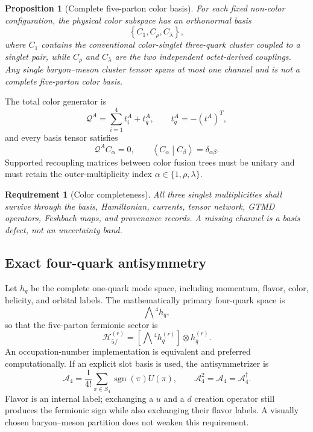 \documentclass[11pt]{article}
\newtheorem{requirement}[definition]{Requirement}
\newtheorem{proposition}[definition]{Proposition}
\newcommand{\Hil}{\mathcal H}
\newcommand{\cQ}{\mathcal Q}
\newcommand{\cA}{\mathcal A}
\newcommand{\inner}[2]{\left\langle #1\middle|#2\right\rangle}
\begin{document}
\begin{proposition}[Complete five-parton color basis]
For each fixed non-color configuration, the physical color subspace has an
orthonormal basis
\begin{equation}
 \left\{
 C_{1},C_{\rho},C_{\lambda}
 \right\},
\end{equation}
where \(C_1\) contains the conventional color-singlet three-quark cluster
coupled to a singlet pair, while \(C_{\rho}\) and \(C_{\lambda}\) are the two
independent octet-derived couplings.  Any single baryon--meson cluster tensor
spans at most one channel and is not a complete five-parton color basis.
\end{proposition}

The total color generator is
\begin{equation}
 \cQ^A
 =
 \sum_{i=1}^{4}t_i^A
 +t_{\bar q}^A,
 \qquad
 t_{\bar q}^A=-\left(t^A\right)^T,
\end{equation}
and every basis tensor satisfies
\begin{equation}
 \cQ^A C_{\alpha}=0,
 \qquad
 \inner{C_{\alpha}}{C_{\beta}}=\delta_{\alpha\beta}.
\end{equation}
Supported recoupling matrices between color fusion trees must be unitary and
must retain the outer-multiplicity index \(\alpha\in\{1,\rho,\lambda\}\).

\begin{requirement}[Color completeness]
All three singlet multiplicities shall survive through the basis,
Hamiltonian, currents, tensor network, GTMD operators, Feshbach maps, and
provenance records.  A missing channel is a basis defect, not an uncertainty
band.
\end{requirement}

\subsection{Exact four-quark antisymmetry}

Let \(h_q\) be the complete one-quark mode space, including momentum, flavor,
color, helicity, and orbital labels.  The mathematically primary four-quark
space is
\begin{equation}
 \bigwedge{}^4 h_q,
\end{equation}
so that the five-parton fermionic sector is
\begin{equation}
 \Hil_{5f}^{(r)}
 =
 \left[
 \bigwedge{}^4 h_q^{(r)}
 \right]
 \otimes h_{\bar q}^{(r)}.
 \label{eq:exterior-space}
\end{equation}
An occupation-number implementation is equivalent and preferred
computationally.  If an explicit slot basis is used, the antisymmetrizer is
\begin{equation}
 \cA_4
 =\frac{1}{4!}
 \sum_{\pi\in S_4}
 \operatorname{sgn}(\pi)U(\pi),
 \qquad
 \cA_4^2=\cA_4=\cA_4^{\dagger}.
 \label{eq:antisymmetrizer}
\end{equation}
Flavor is an internal label; exchanging a \(u\) and a \(d\) creation operator
still produces the fermionic sign while also exchanging their flavor labels.
A visually chosen baryon--meson partition does not weaken this requirement.
\end{document}
